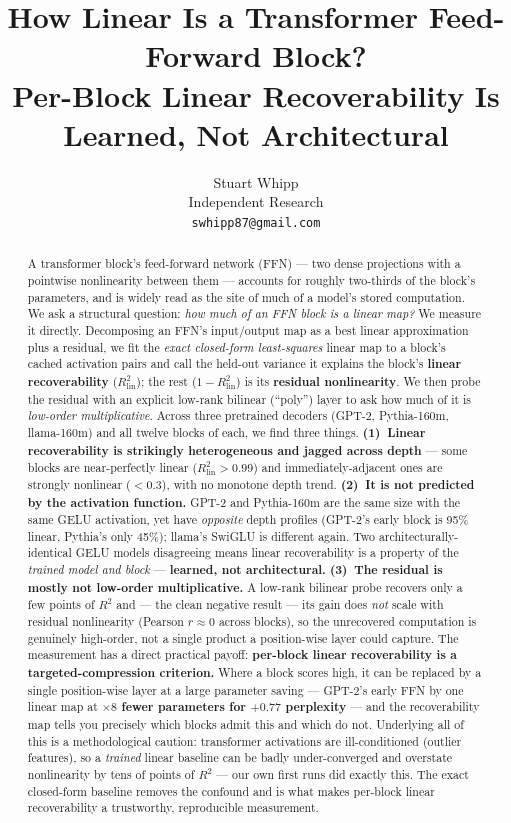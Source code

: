 \documentclass{article}
\title{How Linear Is a Transformer Feed-Forward Block?\\
Per-Block Linear Recoverability Is Learned, Not Architectural}
\author{%
  Stuart Whipp\\
  Independent Research\\
  \texttt{swhipp87@gmail.com}
}
\newcommand{\Rlin}{R^2_{\mathrm{lin}}}
\begin{document}
\maketitle

\begin{abstract}
A transformer block's feed-forward network (FFN) --- two dense projections with a
pointwise nonlinearity between them --- accounts for roughly two-thirds of the block's
parameters, and is widely read as the site of much of a model's stored computation. We
ask a structural question: \emph{how much of an FFN block is a linear map?} We measure it
directly. Decomposing an FFN's input/output map as a best linear approximation plus a
residual, we fit the \emph{exact closed-form least-squares} linear map to a block's cached
activation pairs and call the held-out variance it explains the block's \textbf{linear
recoverability} ($\Rlin$); the rest ($1-\Rlin$) is its \textbf{residual nonlinearity}. We
then probe the residual with an explicit low-rank bilinear (``poly'') layer to ask how
much of it is \emph{low-order multiplicative}. Across three pretrained decoders (GPT-2,
Pythia-160m, llama-160m) and all twelve blocks of each, we find three things.
\textbf{(1)~Linear recoverability is strikingly heterogeneous and jagged across depth} ---
some blocks are near-perfectly linear ($\Rlin > 0.99$) and immediately-adjacent ones are
strongly nonlinear ($< 0.3$), with no monotone depth trend. \textbf{(2)~It is not predicted
by the activation function.} GPT-2 and Pythia-160m are the same size with the same GELU
activation, yet have \emph{opposite} depth profiles (GPT-2's early block is 95\% linear,
Pythia's only 45\%); llama's SwiGLU is different again. Two architecturally-identical GELU
models disagreeing means linear recoverability is a property of the \emph{trained model and
block} --- \textbf{learned, not architectural.} \textbf{(3)~The residual is mostly not
low-order multiplicative.} A low-rank bilinear probe recovers only a few points of $R^2$
and --- the clean negative result --- its gain does \emph{not} scale with residual
nonlinearity (Pearson $r\approx 0$ across blocks), so the unrecovered computation is
genuinely high-order, not a single product a position-wise layer could capture. The
measurement has a direct practical payoff: \textbf{per-block linear recoverability is a
targeted-compression criterion.} Where a block scores high, it can be replaced by a single
position-wise layer at a large parameter saving --- GPT-2's early FFN by one linear map at
\textbf{$\times 8$ fewer parameters for $+0.77$ perplexity} --- and the recoverability map
tells you precisely which blocks admit this and which do not. Underlying all of this is a
methodological caution: transformer activations are ill-conditioned (outlier features), so
a \emph{trained} linear baseline can be badly under-converged and overstate nonlinearity by
tens of points of $R^2$ --- our own first runs did exactly this. The exact closed-form
baseline removes the confound and is what makes per-block linear recoverability a
trustworthy, reproducible measurement.
\end{abstract}
\end{document}
